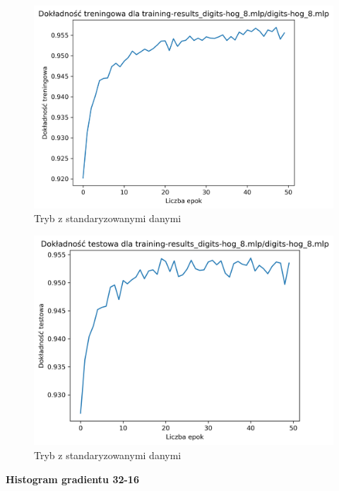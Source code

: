 \documentclass{classrep}
\begin{document}
{{{\begin{figure}[!htbp]
                    \includegraphics[width=145mm]{wykresy/digits-hog_8_mlp_training-accuracy.png}
                    \caption{Tryb z standaryzowanymi danymi}
                \end{figure}
                \begin{figure}[!htbp]
                    \centering
                    \includegraphics[width=145mm]{wykresy/digits-hog_8_mlp_testing-accuracy.png}
                    \caption{Tryb z standaryzowanymi danymi}
                \end{figure}
                \FloatBarrier
                \textbf{Histogram gradientu 32-16}
                \begin{figure}[!htbp]
                    \centering

\end{figure}}}}
\end{document}
